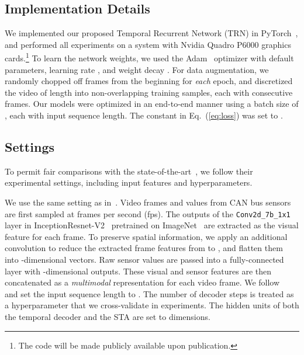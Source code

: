 \subsection{Implementation Details}
We implemented our proposed Temporal Recurrent Network (TRN) in 
PyTorch~\cite{pytorch}, and performed all
experiments on a system with Nvidia Quadro P6000 graphics
cards.\footnote{The code will be made publicly available upon
publication.} To learn the network weights, we used the
Adam~\cite{kingma2014adam} optimizer with default parameters, learning
rate , and weight decay . For data augmentation,
we randomly chopped off  frames from the 
beginning for \textit{each} epoch, and discretized the
video of length  into  non-overlapping training
samples, each with  consecutive frames.
Our models were optimized in an end-to-end manner using a batch size
of , each with  input sequence length.
The constant  in Eq.~(\ref{eq:loss})
was set to .

\subsection{Settings}
To permit fair comparisons with the
state-of-the-art~\cite{RamanishkaCVPR2018,de2016online,gao2017red},
we follow their experimental settings, including input features and
hyperparameters.

We use the same setting as in~\cite{RamanishkaCVPR2018}.
Video frames and values from CAN bus sensors are first sampled at
 frames per second (fps). The outputs of the \texttt{Conv2d\_7b\_1x1} layer in
InceptionResnet-V2~\cite{szegedy2016inception} pretrained on
ImageNet~\cite{deng2009imagenet} are extracted as the visual
feature for each frame. To preserve spatial information, we
apply an additional  convolution to reduce the extracted
frame features from  to
, and flatten them into -dimensional vectors.
Raw sensor values are passed into a fully-connected layer with
-dimensional outputs. These visual and sensor features are then
concatenated as a \textit{multimodal} representation for each video
frame.  We follow~\cite{RamanishkaCVPR2018} and set the input sequence
length  to  . The number of decoder steps  is
treated as a hyperparameter that we cross-validate in 
experiments. The hidden units of both the temporal decoder and the STA
are set to  dimensions.

